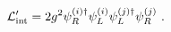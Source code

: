 \begin{equation}
{\cal L}_{\rm int}' = 2 g^2 \psi_R^{(i)\dagger} \psi_L^{(i)} \psi_L^{(j)\dagger} \psi_R^{(j)} \ .
\label{eq5p}
\end{equation}

